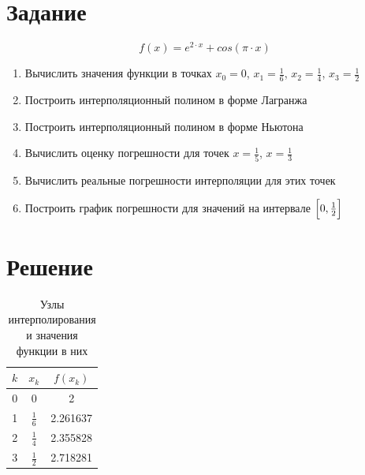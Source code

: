




\section{Задание}

\begin{displaymath}
f(x) = e^{2 \cdot x} + cos(\pi \cdot x)
\end{displaymath}

\begin{enumerate}

\item Вычислить значения функции в точках $x_0 = 0$, $x_1 = \frac{1}{6}$, $x_2 = \frac{1}{4}$, $x_3 = \frac{1}{2}$

\item Построить интерполяционный полином в форме Лагранжа

\item Построить интерполяционный полином в форме Ньютона

\item Вычислить оценку погрешности для точек $x = \frac{1}{5}$, $x = \frac{1}{3}$

\item Вычислить реальные погрешности интерполяции для этих точек

\item Построить график погрешности для значений на интервале $\Bigl [ 0, \frac{1}{2} \Bigl ]$

\end{enumerate}

\section{Решение}

\begin{table}[H]
	\begin{center}
	\caption{Узлы интерполирования и значения функции в них}
	\renewcommand{\tabcolsep}{1cm}
	\renewcommand{\arraystretch}{2}
		\begin{tabular}{|c|c|c|}
			\hline 
			$k$ & $x_k$ & $f(x_k)$ \\  
			\hline 
			0 & 0 & 2 \\ 
			\hline 
			1 & $\frac{1}{6}$ & 2.261637 \\
			\hline 
			2 & $\frac{1}{4}$ & 2.355828 \\  
			\hline 
			3 & $\frac{1}{2}$ & 2.718281 \\ 
			\hline 
		\end{tabular} 	
		\label{tabular:11}
	\end{center}
\end{table}

